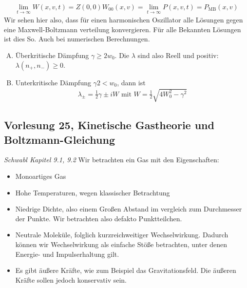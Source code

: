 \begin{itemize}
\begin{description}
\begin{align*}
          \lim_{t\to \infty} W(x, v, t) = Z(0,0) W_{00}(x,v) =
          \lim_{t\to \infty} P(x, v, t) = P_\text{MB}(x, v)
        \end{align*}
        Wir sehen hier also, dass für einen harmonischen Oszillator alle Lösungen
        gegen eine Maxwell-Boltzmann verteilung konvergieren. Für alle Bekannten Lösungen
        ist dies So. Auch bei numerischen Berechnungen.
        \begin{enumerate}[A)]
          \item Überkritische Dämpfung $\gamma \ge 2 w_0$. Die $\lambda$ sind
            also Reell und positiv: $\lambda(n_+, n_-) \ge 0$.
        \item Unterkritische Dämpfung $\gamma 2 < w_0$, dann ist
          \begin{align*}
            \lambda_{ \pm } = \frac{1}{2} \gamma \pm i W \text{ mit } W = \frac{1}{2}
            \sqrt{4 W_0^2 - \gamma^2}
          \end{align*}
        \end{enumerate}



    \end{description}
\end{itemize}





\subsection*{Vorlesung 25, Kinetische Gastheorie und Boltzmann-Gleichung}
\emph{Schwabl Kapitel 9.1, 9.2}
Wir betrachten ein Gas mit den Eigenschaften:
\begin{itemize}
  \item Monoartiges Gas
  \item Hohe Temperaturen, wegen klassischer Betrachtung
  \item Niedrige Dichte, also einem Großen Abstand im vergleich
    zum Durchmesser der Punkte. Wir betrachten also defakto Punktteilchen.
  \item Neutrale Moleküle, folglich kurzreichweitiger Wechselwirkung. Dadurch
    können wir Wechselwirkung als einfache Stöße betrachten, unter denen
    Energie- und Impulserhaltung gilt.
  \item Es gibt äußere Kräfte, wie zum Beispiel das Gravitationsfeld.
    Die äußeren Kräfte sollen jedoch konservativ sein.
\end{itemize}
